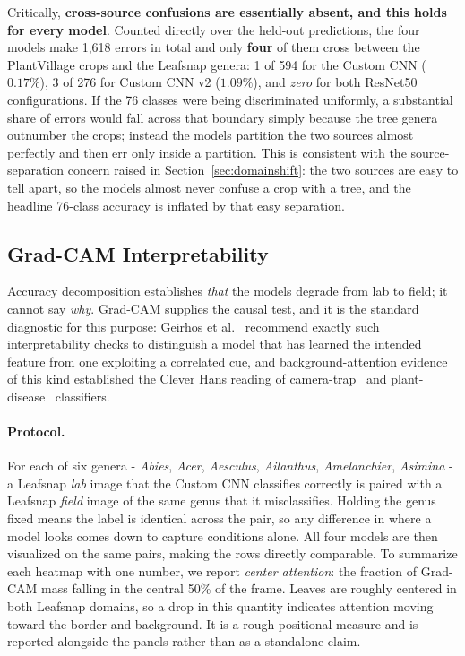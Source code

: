 \documentclass[12pt,a4paper]{article}
\begin{document}
Critically, \textbf{cross-source confusions are essentially absent, and this holds for every model}. Counted directly over the held-out predictions, the four models make 1{,}618 errors in total and only \textbf{four} of them cross between the PlantVillage crops and the Leafsnap genera: 1 of 594 for the Custom CNN ($0.17\%$), 3 of 276 for Custom CNN v2 ($1.09\%$), and \emph{zero} for both ResNet50 configurations. If the 76 classes were being discriminated uniformly, a substantial share of errors would fall across that boundary simply because the tree genera outnumber the crops; instead the models partition the two sources almost perfectly and then err only inside a partition. This is consistent with the source-separation concern raised in Section~\ref{sec:domainshift}: the two sources are easy to tell apart, so the models almost never confuse a crop with a tree, and the headline 76-class accuracy is inflated by that easy separation.

\subsection{Grad-CAM Interpretability}
\label{sec:gradcamresults}
Accuracy decomposition establishes \emph{that} the models degrade from lab to field; it cannot say \emph{why}. Grad-CAM supplies the causal test, and it is the standard diagnostic for this purpose: Geirhos et al.~\cite{geirhos2020} recommend exactly such interpretability checks to distinguish a model that has learned the intended feature from one exploiting a correlated cue, and background-attention evidence of this kind established the Clever Hans reading of camera-trap~\cite{beery2018} and plant-disease~\cite{ahmad2023} classifiers.

\paragraph{Protocol.} For each of six genera - \emph{Abies}, \emph{Acer}, \emph{Aesculus}, \emph{Ailanthus}, \emph{Amelanchier}, \emph{Asimina} - a Leafsnap \emph{lab} image that the Custom CNN classifies correctly is paired with a Leafsnap \emph{field} image of the same genus that it misclassifies. Holding the genus fixed means the label is identical across the pair, so any difference in where a model looks comes down to capture conditions alone. All four models are then visualized on the same pairs, making the rows directly comparable. To summarize each heatmap with one number, we report \emph{center attention}: the fraction of Grad-CAM mass falling in the central 50\% of the frame. Leaves are roughly centered in both Leafsnap domains, so a drop in this quantity indicates attention moving toward the border and background. It is a rough positional measure and is reported alongside the panels rather than as a standalone claim.
\end{document}
